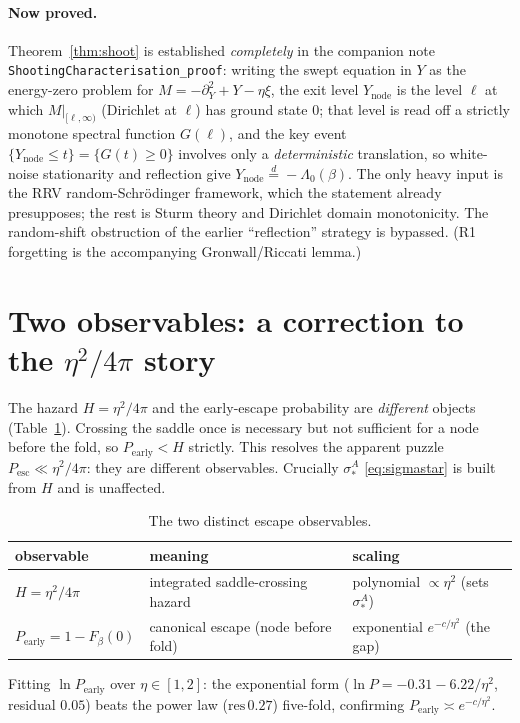 \documentclass[11pt]{article}
\theoremstyle{remark}
\newcommand{\Ynode}{Y_{\mathrm{node}}}
\newcommand{\Pearly}{P_{\mathrm{early}}}
\newcommand{\eqd}{\stackrel{d}{=}}
\begin{document}
\paragraph{Now proved.} Theorem~\ref{thm:shoot} is established \emph{completely} in the
companion note \texttt{ShootingCharacterisation\_proof}: writing the swept equation in
$Y$ as the energy-zero problem for $M=-\partial_Y^2+Y-\eta\xi$, the exit level $\Ynode$
is the level $\ell$ at which $M|_{[\ell,\infty)}$ (Dirichlet at $\ell$) has ground state
$0$; that level is read off a strictly monotone spectral function $G(\ell)$, and the key
event $\{\Ynode\le t\}=\{G(t)\ge0\}$ involves only a \emph{deterministic} translation, so
white-noise stationarity and reflection give $\Ynode\eqd-\Lambda_0(\beta)$. The only
heavy input is the RRV random-Schr\"odinger framework, which the statement already
presupposes; the rest is Sturm theory and Dirichlet domain monotonicity. The random-shift
obstruction of the earlier ``reflection'' strategy is bypassed. (R1 forgetting is the
accompanying Gronwall/Riccati lemma.)

\section{Two observables: a correction to the $\eta^2/4\pi$ story}\label{sec:two}

The hazard $H=\eta^2/4\pi$ and the early-escape probability are \emph{different}
objects (Table~\ref{tab:two}). Crossing the saddle once is necessary but not
sufficient for a node before the fold, so $\Pearly<H$ strictly. This resolves the
apparent puzzle $P_{\mathrm{esc}}\ll\eta^2/4\pi$: they are different observables.
Crucially $\sigma_*^A$ \eqref{eq:sigmastar} is built from $H$ and is unaffected.

\begin{table}[h]\centering
\begin{tabular}{@{}lll@{}}
\toprule
observable & meaning & scaling \\
\midrule
$H=\eta^2/4\pi$ & integrated saddle-crossing hazard & polynomial $\propto\eta^2$ (sets $\sigma_*^A$)\\
$\Pearly=1-F_\beta(0)$ & canonical escape (node before fold) & exponential $e^{-c/\eta^2}$ (the gap)\\
\bottomrule
\end{tabular}
\caption{The two distinct escape observables.}\label{tab:two}
\end{table}

\noindent Fitting $\ln\Pearly$ over $\eta\in[1,2]$: the exponential form
($\ln P=-0.31-6.22/\eta^2$, residual $0.05$) beats the power law ($\mathrm{res}\,0.27$)
five-fold, confirming $\Pearly\asymp e^{-c/\eta^2}$.
\end{document}
